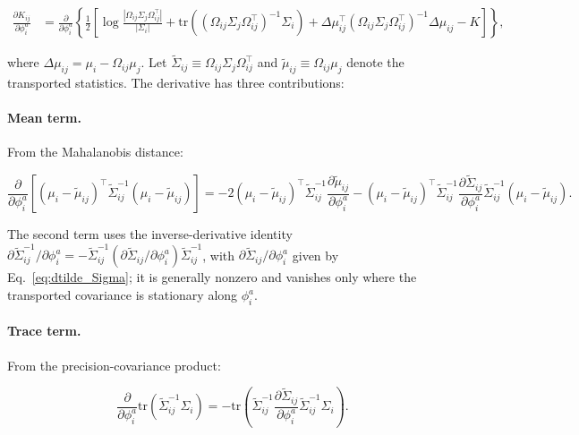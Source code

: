 \documentclass[twoside,11pt]{article}
\begin{document}
\begin{align}
\frac{\partial K_{ij}}{\partial \phi_i^a}
&= \frac{\partial}{\partial \phi_i^a}\left\{
\frac{1}{2}\left[
\log\frac{|\Omega_{ij}\Sigma_j\Omega_{ij}^\top|}{|\Sigma_i|}
+ \mathrm{tr} \left((\Omega_{ij}\Sigma_j\Omega_{ij}^\top)^{-1}\Sigma_i\right)
+ \Delta\mu_{ij}^\top (\Omega_{ij}\Sigma_j\Omega_{ij}^\top)^{-1} \Delta\mu_{ij}
- K
\right]\right\},
\label{eq:dKL_dphi_expanded}
\end{align}

where $\Delta\mu_{ij} = \mu_i - \Omega_{ij}\mu_j$. Let $\tilde{\Sigma}_{ij} \equiv \Omega_{ij}\Sigma_j\Omega_{ij}^\top$ and $\tilde{\mu}_{ij} \equiv \Omega_{ij}\mu_j$ denote the transported statistics. The derivative has three contributions:

\paragraph{Mean term.} From the Mahalanobis distance:

\begin{equation}
\frac{\partial}{\partial \phi_i^a}\left[(\mu_i - \tilde{\mu}_{ij})^\top \tilde{\Sigma}_{ij}^{-1}(\mu_i - \tilde{\mu}_{ij})\right]
= -2(\mu_i - \tilde{\mu}_{ij})^\top \tilde{\Sigma}_{ij}^{-1} \frac{\partial \tilde{\mu}_{ij}}{\partial \phi_i^a}
- (\mu_i - \tilde{\mu}_{ij})^\top \tilde{\Sigma}_{ij}^{-1} \frac{\partial \tilde{\Sigma}_{ij}}{\partial \phi_i^a} \tilde{\Sigma}_{ij}^{-1} (\mu_i - \tilde{\mu}_{ij}).
\label{eq:mean_term_phi}
\end{equation}

The second term uses the inverse-derivative identity $\partial\tilde{\Sigma}_{ij}^{-1}/\partial\phi_i^a = -\tilde{\Sigma}_{ij}^{-1}(\partial\tilde{\Sigma}_{ij}/\partial\phi_i^a)\tilde{\Sigma}_{ij}^{-1}$, with $\partial\tilde{\Sigma}_{ij}/\partial\phi_i^a$ given by Eq.~\eqref{eq:dtilde_Sigma}; it is generally nonzero and vanishes only where the transported covariance is stationary along $\phi_i^a$.

\paragraph{Trace term.} From the precision-covariance product:

\begin{equation}
\frac{\partial}{\partial \phi_i^a}\mathrm{tr}(\tilde{\Sigma}_{ij}^{-1}\Sigma_i)
= -\mathrm{tr} \left(\tilde{\Sigma}_{ij}^{-1} \frac{\partial \tilde{\Sigma}_{ij}}{\partial \phi_i^a} \tilde{\Sigma}_{ij}^{-1} \Sigma_i\right).
\label{eq:trace_term_phi}
\end{equation}
\end{document}

